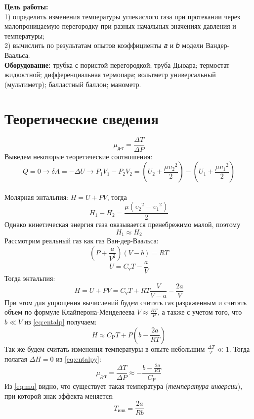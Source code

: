 \textbf{Цель работы: }\\
1) определить изменения температуры углекислого газа 
при протекании через малопроницаемую перегородку при разных начальных 
значениях давления и температуры;\\
2) вычислить по результатам опытов коэффициенты 𝑎 и 𝑏 модели Вандер-Ваальса.\\ \indent
\textbf{Оборудование: }трубка с пористой перегородкой; труба Дьюара; термостат
жидкостной; дифференциальная термопара; вольтметр универсальный (мультиметр);
балластный баллон; манометр.\\ 

\section*{Теоретические сведения}
\indent
{}
\begin{equation}
    \mu_{\text{д-т}} = \frac{\Delta T}{\Delta P} 
\end{equation} 
Выведем некоторые теоретические соотношения:
$$Q=0 \rightarrow \delta A = -\Delta U \rightarrow P_1 V_1-P_2 V_2 = 
(U_2 + \frac{\mu {\upsilon_2}^2}{2})-(U_1 + \frac{\mu {\upsilon_1}^2}{2})$$\\
Молярная энтальпия: $H = U+PV$, тогда 
$$H_1 - H_2 = \frac{\mu ({\upsilon_2}^2 - {\upsilon_1}^2)}{2}$$ 
Однако кинетическая энергия газа оказывается пренебрежимо малой, поэтому
$$H_1 \approx H_2$$
Рассмотрим реальный газ как газ Ван-дер-Ваальса:
$$\left ( P+\frac{a}{V^2}\right )(V-b) = RT$$
$$U = C_\text{v}T-\frac{a}{V}$$
Тогда энтальпия:
\begin{equation} \label{eq:entalp}
    H = U+PV=C_{\text{v}}T+RT\frac{V}{V-a} - \frac{2a}{V}
\end{equation}
При этом для упрощения вычислений будем считать газ разряженным и 
считать объем по формуле Клайперона-Менделеева $V \approx \frac{RT}{P}$, 
а также с учетом того, что $b \ll V$ из \ref{eq:entalp} получаем:
\begin{equation} \label{eq:entalpy}
H \approx C_{\text{P}}T + P \left (b- \frac{2a}{RT} \right )
\end{equation}
Так же будем считать изменения температуры в опыте небольшим 
$\frac{\Delta T}{T} \ll 1$. Тогда полагая $\Delta H = 0$ из \ref{eq:entalpy}:
\begin{equation}\label{eq:mu}
    \mu_{\text{д-т}} = \frac{\Delta T}{\Delta P} \approx -
    \frac{b - \frac{2a}{RT}}{C_{\text{P}}}
\end{equation}
Из \ref{eq:mu} видно, что существует такая температура (\emph{температура инверсии}),
при которой знак эффекта меняется:
\begin{equation}\label{eq:temperature}
    T_{\text{инв}} = \frac{2a}{Rb}
\end{equation}

